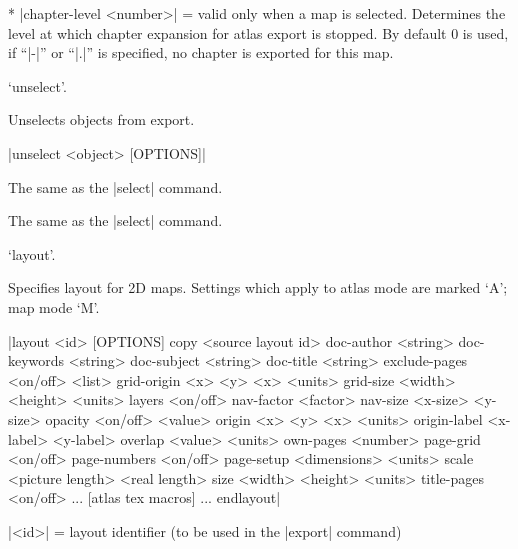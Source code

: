   * |chapter-level <number>| = valid only when a map is selected. Determines
    the level at which chapter expansion for atlas export is stopped. 
    By default 0 is used, if ``|-|'' or ``|.|'' is specified, no chapter is
    exported for this map.
\endoptions



\subsubchapter `unselect'.

\description
  Unselects objects from export.
\enddescription

\syntax
  |unselect <object> [OPTIONS]|
\endsyntax

\arguments
  The same as the |select| command.
\endarguments

\options
  The same as the |select| command. 
\endoptions


\subsubchapter `layout'.

\description
  Specifies layout for 2D maps. Settings which apply to atlas mode
  are marked `A'; map mode `M'.
\enddescription

\syntax
  |layout <id> [OPTIONS]
          copy <source layout id>
          doc-author <string>
          doc-keywords <string>
          doc-subject <string>
          doc-title <string>
          exclude-pages <on/off> <list>
          grid-origin <x> <y> <x> <units>
          grid-size <width> <height> <units>
          layers <on/off>
          nav-factor <factor>
          nav-size <x-size> <y-size>
          opacity <on/off> <value>
          origin <x> <y> <x> <units>
          origin-label <x-label> <y-label>
          overlap <value> <units>
          own-pages <number>
          page-grid <on/off>
          page-numbers <on/off>
          page-setup <dimensions> <units>
          scale <picture length> <real length>
          size <width> <height> <units>
          title-pages <on/off>
          ... [atlas tex macros] ...
        endlayout|
\endsyntax

\arguments
  |<id>| = layout identifier (to be used in the |export| command)
\endarguments

\options
\endoptions


